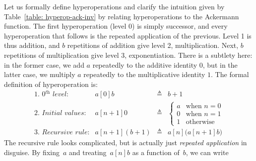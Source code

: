 Let us formally define hyperoperations and clarify the intuition
given by Table~\ref{table: hyperop-ack-inv} by relating hyperoperations to
the Ackermann function.
The first hyperoperation (level 0) is simply successor, and
every hyperoperation that follows is the repeated application of the previous.
Level 1 is thus addition, and $b$ repetitions of addition
give level 2, multiplication. Next, $b$ repetitions of
multiplication give level 3, exponentiation.
There is a subtlety here: in the former case, we add $a$
repeatedly to the additive identity $0$, but in the
latter case, we multiply $a$ repeatedly to the multiplicative identity $1$. 
The formal definition of hyperoperation is:
\begin{equation}
\label{eq:hyper}
\begin{array}{lrcl}
\textit{1. 0$^{\textit{th}}$ level:} & a[0]b & \triangleq & b + 1 \\
\textit{2. Initial values:} & a[n+1]0 & \triangleq &
  \begin{cases}
    a & \text{when } n = 0 \\
    0 & \text{when } n = 1 \\
    1 & \text{otherwise}
  \end{cases} \\
\textit{3. Recursive rule:} & a[n+1](b+1) & \triangleq & a[n]\big(a[n+1]b\big)
\end{array}
\end{equation}
The recursive rule looks complicated, but is actually just \emph{repeated application} in disguise. By fixing~$a$ and treating~$a[n]b$ as a function of~$b$, we can write

